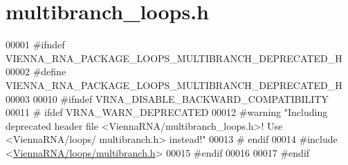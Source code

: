 \hypertarget{multibranch__loops_8h_source}{}\section{multibranch\+\_\+loops.\+h}
\label{multibranch__loops_8h_source}

\begin{DoxyCode}
00001 \textcolor{preprocessor}{#ifndef VIENNA\_RNA\_PACKAGE\_LOOPS\_MULTIBRANCH\_DEPRECATED\_H}
00002 \textcolor{preprocessor}{#define VIENNA\_RNA\_PACKAGE\_LOOPS\_MULTIBRANCH\_DEPRECATED\_H}
00003 
00010 \textcolor{preprocessor}{#ifndef VRNA\_DISABLE\_BACKWARD\_COMPATIBILITY}
00011 \textcolor{preprocessor}{# ifdef VRNA\_WARN\_DEPRECATED}
00012 \textcolor{preprocessor}{#warning "Including deprecated header file <ViennaRNA/multibranch\_loops.h>! Use <ViennaRNA/loops/
      multibranch.h> instead!"}
00013 \textcolor{preprocessor}{# endif}
00014 \textcolor{preprocessor}{#include <\hyperlink{multibranch_8h}{ViennaRNA/loops/multibranch.h}>}
00015 \textcolor{preprocessor}{#endif}
00016 
00017 \textcolor{preprocessor}{#endif}
\end{DoxyCode}
